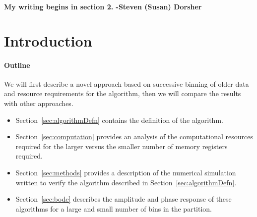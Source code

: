 \documentclass[preprint,12pt]{elsarticle}
\begin{document}



{\bf My writing begins in section 2. -Steven (Susan) Dorsher}

\section{Introduction}\label{sec:intro}
\setcounter{section}{1}
\setcounter{equation}{0}



\paragraph{Outline\\}
We will first describe a novel approach based on successive 
binning of older data and resource requirements for the 
algorithm, then we will compare the results with other
approaches.


\begin{itemize} 
\item Section~\ref{sec:algorithmDefn} contains the definition of
the algorithm. 
\item  Section~\ref{sec:computation} provides an analysis of the
  computational resources required for the larger versus the smaller
  number of memory registers required.
\item Section~\ref{sec:methods} provides a description of the
  numerical simulation written to verify the algorithm described in
  Section~\ref{sec:algorithmDefn}.
\item Section~\ref{sec:bode} describes the amplitude and phase response
  of these algorithms for a large and small number of bins in the
  partition.
\end{itemize}
\end{document}
